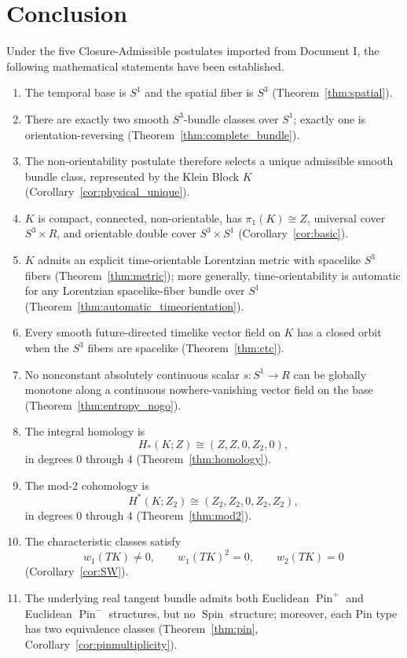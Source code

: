 \documentclass[11pt]{article}
\theoremstyle{canonmath}
\theoremstyle{canonpostulate}
\theoremstyle{canonproposition}
\providecommand{\Klein}{\mathcal{K}}
\providecommand{\R}{\mathbb{R}}
\providecommand{\Z}{\mathbb{Z}}
\providecommand{\Ztwo}{\mathbb{Z}_2}
\providecommand{\Sone}{S^1}
\providecommand{\Sthree}{S^3}
\providecommand{\Pin}{\operatorname{Pin}}
\providecommand{\Spin}{\operatorname{Spin}}
\def\mathbb#1{#1}%
\def\mathcal#1{#1}%
\begin{document}
\section{Conclusion}

Under the five Closure-Admissible postulates imported from Document I, the following mathematical statements have been established.

\begin{enumerate}
    \item The temporal base is $\Sone$ and the spatial fiber is $\Sthree$ (Theorem~\ref{thm:spatial}).
    \item There are exactly two smooth $\Sthree$-bundle classes over $\Sone$; exactly one is orientation-reversing (Theorem~\ref{thm:complete_bundle}).
    \item The non-orientability postulate therefore selects a unique admissible smooth bundle class, represented by the Klein Block $\Klein$ (Corollary~\ref{cor:physical_unique}).
    \item $\Klein$ is compact, connected, non-orientable, has $\pi_1(\Klein)\cong\Z$, universal cover $\Sthree\times\R$, and orientable double cover $\Sthree\times\Sone$ (Corollary~\ref{cor:basic}).
    \item $\Klein$ admits an explicit time-orientable Lorentzian metric with spacelike $\Sthree$ fibers (Theorem~\ref{thm:metric}); more generally, time-orientability is automatic for any Lorentzian spacelike-fiber bundle over $\Sone$ (Theorem~\ref{thm:automatic_timeorientation}).
    \item Every smooth future-directed timelike vector field on $\Klein$ has a closed orbit when the $\Sthree$ fibers are spacelike (Theorem~\ref{thm:ctc}).
    \item No nonconstant absolutely continuous scalar $s:\Sone\to\R$ can be globally monotone along a continuous nowhere-vanishing vector field on the base (Theorem~\ref{thm:entropy_nogo}).
    \item The integral homology is
    \[
    H_*(\Klein;\Z)\cong(\Z,\Z,0,\Ztwo,0),
    \]
    in degrees $0$ through $4$ (Theorem~\ref{thm:homology}).
    \item The mod-2 cohomology is
    \[
    H^*(\Klein;\Ztwo)\cong(\Ztwo,\Ztwo,0,\Ztwo,\Ztwo),
    \]
    in degrees $0$ through $4$ (Theorem~\ref{thm:mod2}).
    \item The characteristic classes satisfy
    \[
    w_1(T\Klein)\neq0,
    \qquad
    w_1(T\Klein)^2=0,
    \qquad
    w_2(T\Klein)=0
    \]
    (Corollary~\ref{cor:SW}).
    \item The underlying real tangent bundle admits both Euclidean $\Pin^+$ and Euclidean $\Pin^-$ structures, but no $\Spin$ structure; moreover, each Pin type has two equivalence classes (Theorem~\ref{thm:pin}, Corollary~\ref{cor:pinmultiplicity}).
\end{enumerate}
\end{document}
